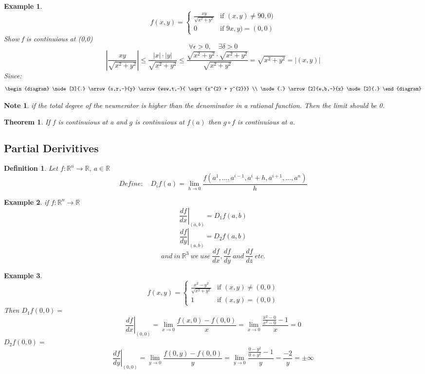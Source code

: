 \documentclass[12pt]{article}
\def\RR{\mathbb{R}}
\newtheorem{theorem}{Theorem}[section]
\newtheorem{definition}{Definition}[section]
\newtheorem{example}{Example}[section]
\newtheorem*{note}{Note}
\begin{document}
\begin{example}

\[
 f(x,y) =
  \begin{cases}
   \frac{xy}{\sqrt{x^{2} + y^{2}}} & \text{if } (x,y) \neq 90,0) \\
   0       & \text{if } 9x,y) = (0,0)
  \end{cases}
\]
Show f is continuious at (0,0)
\[\forall \epsilon > 0, \quad \exists \delta>0\]
\[\left| \frac{xy}{\sqrt{x^{2} + y^{2}}}\right| \leq \frac{|x| \cdot |y|}{\sqrt{x^{2} + y^{2}}} \leq \frac{\sqrt{x^{2} + y^{2}} \cdot \sqrt{x^{2} + y^{2}}}{\sqrt{x^{2} + y^{2}}}= \sqrt{x^{2} + y^{2}} = |(x,y)|\]
Since: \[\begin{diagram}
\node[3]{.} \arrow{s,r,-}{y} \arrow{wsw,t,-}{ \sqrt{x^{2} + y^{2}}} \\
\node{.} \arrow[2]{e,b,-}{x} \node[2]{.}
\end{diagram}\]
\end{example}
\begin{note}
if the total degree of the neumerator is higher than the denominator in a rational function. Then the limit should be 0.
\end{note}

\begin{theorem}\label{T:composition}
If $f$ is continuious at a and $g$ is continuious at $f(a)$ then $g \circ f$ is continuious at a.
\end{theorem}

\subsection{Partial Derivitives}

\begin{definition}
Let $f:\RR^{n} \rightarrow \RR, \: a\in \RR$
\[Define: \quad D_{i}f(a) = \lim_{h \to 0}\frac{f(a^{1}, \dots , a^{i-1}, a^{i}+h, a^{i+1}, \dots , a^{n})}{h}\]
\end{definition}

\begin{example}
if $f:\RR^{n} \rightarrow \RR$
\[\left.\frac{df}{dx}\right| _{(a,b)} = D_{1}f(a,b)\]
\[\left.\frac{df}{dy}\right| _{(a,b)} = D_{2}f(a,b)\]
\[and \: in \: \RR^{3} \: we\: use \: \frac{df}{dx}, \frac{df}{dy} \: and \: \frac{df}{dz} \: etc.\]
\end{example}

\begin{example}
\[
 f(x,y) =
  \begin{cases}
   \frac{x^{2} - y^{2}}{\sqrt{x^{2} + y^{2}}} & \text{if } (x,y) \neq (0,0) \\
   1       & \text{if } (x,y) = (0,0)
  \end{cases}
\]
Then $D_{1}f(0,0) =$
\[\left.\frac{df}{dx}\right| _{(0,0)} =  \lim_{x \to 0}\frac{f(x,0) - f(0,0)}{x}= \lim_{x \to 0}\frac{\frac{x^{2}-0}{x^{2}-0} -1}{x} = 0\]
$D_{2}f(0,0) =$
\[\left.\frac{df}{dy}\right| _{(0,0)} =  \lim_{y \to 0}\frac{f(0,y) - f(0,0)}{y}= \lim_{y \to 0}\frac{\frac{0-y^{2}}{0+y^{2}} -1}{y} = \frac{-2}{y}= \pm \infty\]
\end{example}
\end{document}
